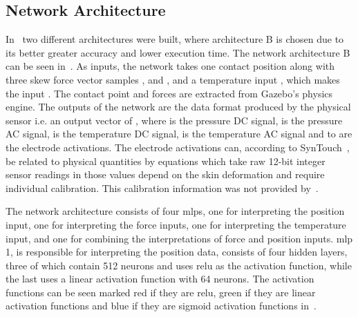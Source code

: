 \subsection{Network Architecture}\label{sec:1-tactile-perception-method-network-architecture}
In~\cite{simulation-of-the-syntouch-biotac-sensor} two different architectures were built, where architecture B is chosen due to its better greater accuracy and lower execution time. The network architecture B can be seen in~. As inputs, the network takes one contact position  along with three skew force vector samples ,  and , and a temperature input , which makes the input . The contact point and forces are extracted from Gazebo's physics engine. The outputs of the network are the data format produced by the physical sensor i.e. an output vector of , where  is the pressure DC signal,  is the pressure AC signal,  is the temperature DC signal,  is the temperature AC signal and  to  are the electrode activations. The electrode activations can, according to SynTouch~\cite{biotac-syntouch-manual}, be related to physical quantities by equations which take raw \num{12}-bit integer sensor readings in \mvar{[0,4095]} those values depend on the skin deformation and require individual calibration. This calibration information was not provided by~\cite{simulation-of-the-syntouch-biotac-sensor}.  \medskip

The network architecture consists of four \gls{mlp}s, one for interpreting the position input, one for interpreting the force inputs, one for interpreting the temperature input, and one for combining the interpretations of force and position inputs. \gls{mlp} \num{1}, is responsible for interpreting the position data, consists of four hidden layers, three of which contain \num{512} neurons and uses \gls{relu} as the activation function, while the last uses a linear activation function with \num{64} neurons. The activation functions can be seen marked red if they are \gls{relu}, green if they are linear activation functions and blue if they are sigmoid activation functions in~. \medskip

